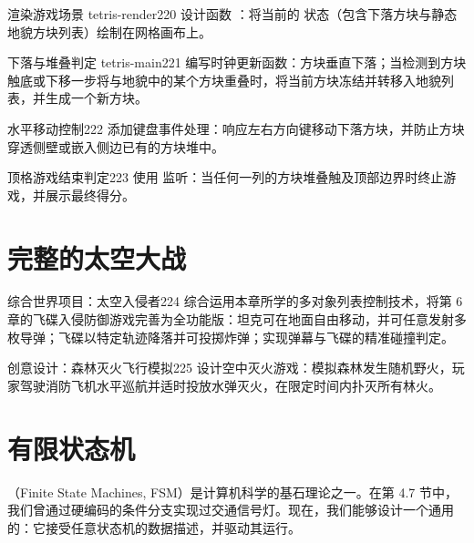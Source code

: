 \begin{exercise}{渲染游戏场景 tetris-render}{220}
设计函数 ：将当前的  状态（包含下落方块与静态地貌方块列表）绘制在网格画布上。
\end{exercise}

\begin{exercise}{下落与堆叠判定 tetris-main}{221}
编写时钟更新函数：方块垂直下落；当检测到方块触底或下移一步将与地貌中的某个方块重叠时，将当前方块冻结并转移入地貌列表，并生成一个新方块。
\end{exercise}

\begin{exercise}{水平移动控制}{222}
添加键盘事件处理：响应左右方向键移动下落方块，并防止方块穿透侧壁或嵌入侧边已有的方块堆中。
\end{exercise}

\begin{exercise}{顶格游戏结束判定}{223}
使用  监听：当任何一列的方块堆叠触及顶部边界时终止游戏，并展示最终得分。
\end{exercise}

\section{完整的太空大战}
\label{sec:ch12_full_space_war}

\begin{exercise}{综合世界项目：太空入侵者}{224}
综合运用本章所学的多对象列表控制技术，将第 6 章的飞碟入侵防御游戏完善为全功能版：坦克可在地面自由移动，并可任意发射多枚导弹；飞碟以特定轨迹降落并可投掷炸弹；实现弹幕与飞碟的精准碰撞判定。
\end{exercise}

\begin{exercise}{创意设计：森林灭火飞行模拟}{225}
设计空中灭火游戏：模拟森林发生随机野火，玩家驾驶消防飞机水平巡航并适时投放水弹灭火，在限定时间内扑灭所有林火。
\end{exercise}

\section{有限状态机}
\label{sec:ch12_finite_state_machines}

（Finite State Machines, FSM）是计算机科学的基石理论之一。在第 4.7 节中，我们曾通过硬编码的条件分支实现过交通信号灯。现在，我们能够设计一个通用的：它接受任意状态机的数据描述，并驱动其运行。


